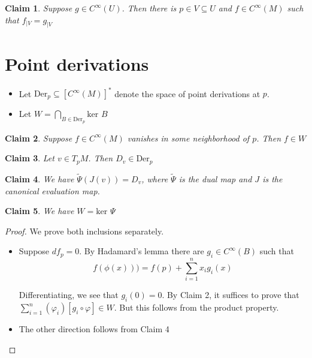 \documentclass{article}
\newtheorem{claim}{Claim}
\begin{document}
\begin{claim}
    Suppose $g \in C^\infty(U)$. Then there is $p \in V \subseteq U$ and $f \in C^\infty(M)$ such that $f_{|V}= g_{|V}$
\end{claim}

\section{Point derivations}

\begin{itemize}
    \item Let $\text{Der}_p \subseteq [C^\infty(M)]^*$ denote the space of point derivations at $p$. 
    \item Let $W=\bigcap_{B \in \text{Der}_p} \text{ker }B$
\end{itemize}

\begin{claim}
    Suppose $f \in C^\infty(M)$ vanishes in some neighborhood of $p$. Then $f \in W$
\end{claim}

\begin{claim}
    Let $v \in T_pM$. Then $D_v \in \text{Der}_p$
\end{claim}

\begin{claim}
    We have $\tilde{\Psi}(J(v))=D_v$, where $\tilde{\Psi}$ is the dual map and $J$ is the canonical evaluation map.
\end{claim}

\begin{claim}
    We have $W = \text{ker } \Psi$
\end{claim}

\begin{proof} We prove both inclusions separately.

    \begin{itemize}
        \item Suppose $df_p=0$. By Hadamard's lemma there are $g_i \in C^\infty(B)$ such that \[f(\phi(x)))= f(p) + \sum_{i=1}^n x_i g_i(x)\]
        
        Differentiating, we see that $g_i(0)=0$. By Claim 2, it suffices to prove that $\sum_{i=1}^n (\varphi_i) [g_i \circ \varphi] \in W$. But this follows from the product property.

    \item The other direction follows from Claim 4
    \end{itemize}
    
\end{proof}
\end{document}
